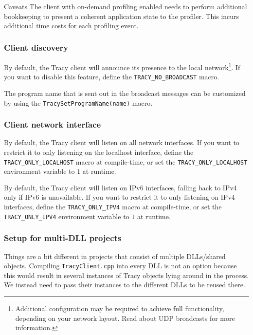 \documentclass[hidelinks,titlepage,a4paper]{article}
\begin{document}
\begin{bclogo}[
noborder=true,
couleur=black!5,
logo=\bcattention
]{Caveats}
The client with on-demand profiling enabled needs to perform additional bookkeeping to present a coherent application state to the profiler. This incurs additional time costs for each profiling event.
\end{bclogo}

\subsubsection{Client discovery}

By default, the Tracy client will announce its presence to the local network\footnote{Additional configuration may be required to achieve full functionality, depending on your network layout. Read about UDP broadcasts for more information.}. If you want to disable this feature, define the \texttt{TRACY\_NO\_BROADCAST} macro.

The program name that is sent out in the broadcast messages can be customized by using the \texttt{TracySetProgramName(name)} macro.

\subsubsection{Client network interface}

By default, the Tracy client will listen on all network interfaces. If you want to restrict it to only listening on the localhost interface, define the \texttt{TRACY\_ONLY\_LOCALHOST} macro at compile-time, or set the \texttt{TRACY\_ONLY\_LOCALHOST} environment variable to $1$ at runtime.

By default, the Tracy client will listen on IPv6 interfaces, falling back to IPv4 only if IPv6 is unavailable. If you want to restrict it to only listening on IPv4 interfaces, define the \texttt{TRACY\_ONLY\_IPV4} macro at compile-time, or set the \texttt{TRACY\_ONLY\_IPV4} environment variable to $1$ at runtime.

\subsubsection{Setup for multi-DLL projects}

Things are a bit different in projects that consist of multiple DLLs/shared objects. Compiling \texttt{TracyClient.cpp} into every DLL is not an option because this would result in several instances of Tracy objects lying around in the process. We instead need to pass their instances to the different DLLs to be reused there.
\end{document}
